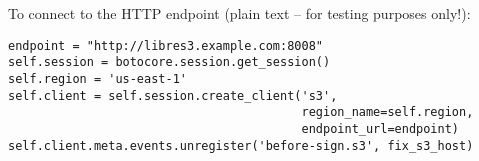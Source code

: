 To connect to the HTTP endpoint (plain text -- for testing purposes only!):
\begin{lstlisting}
endpoint = "http://libres3.example.com:8008"
self.session = botocore.session.get_session()
self.region = 'us-east-1'
self.client = self.session.create_client('s3',
                                         region_name=self.region,
                                         endpoint_url=endpoint)
self.client.meta.events.unregister('before-sign.s3', fix_s3_host)
\end{lstlisting}

